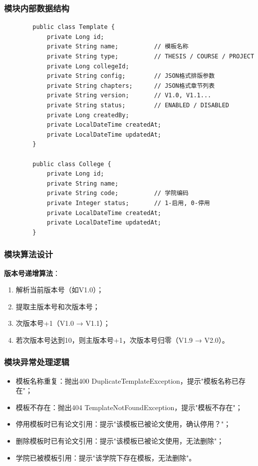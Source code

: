 \documentclass{../template/softeng}
\begin{document}
	\subsubsection{模块内部数据结构}
	\begin{verbatim}
		public class Template {
			private Long id;
			private String name;          // 模板名称
			private String type;          // THESIS / COURSE / PROJECT
			private Long collegeId;
			private String config;        // JSON格式排版参数
			private String chapters;      // JSON格式章节列表
			private String version;       // V1.0, V1.1...
			private String status;        // ENABLED / DISABLED
			private Long createdBy;
			private LocalDateTime createdAt;
			private LocalDateTime updatedAt;
		}

		public class College {
			private Long id;
			private String name;
			private String code;          // 学院编码
			private Integer status;       // 1-启用, 0-停用
			private LocalDateTime createdAt;
			private LocalDateTime updatedAt;
		}
	\end{verbatim}

	\subsubsection{模块算法设计}
	\textbf{版本号递增算法}：
	\begin{enumerate}
		\item 解析当前版本号（如V1.0）；
		\item 提取主版本号和次版本号；
		\item 次版本号+1（V1.0 → V1.1）；
		\item 若次版本号达到10，则主版本号+1，次版本号归零（V1.9 → V2.0）。
	\end{enumerate}

	\subsubsection{模块异常处理逻辑}
	\begin{itemize}
		\item 模板名称重复：抛出400 DuplicateTemplateException，提示"模板名称已存在"；
		\item 模板不存在：抛出404 TemplateNotFoundException，提示"模板不存在"；
		\item 停用模板时已有论文引用：提示"该模板已被论文使用，确认停用？"；
		\item 删除模板时已有论文引用：提示"该模板已被论文使用，无法删除"；
		\item 学院已被模板引用：提示"该学院下存在模板，无法删除"。
	\end{itemize}
\end{document}
